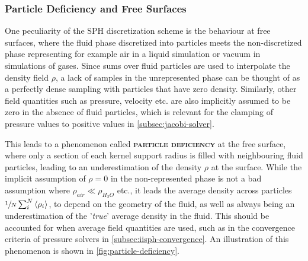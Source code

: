 \documentclass[oneside, a4paper]{book}
\newcommand\emphasis[1]{{\scshape\bfseries#1}}
\newcounter{phase}[algorithm]
\newcommand\angled[1]{\left\langle#1\right\rangle}
\begin{document}
    \subsubsection{Particle Deficiency and Free Surfaces}\label{subsec:particle-deficiency}
    One peculiarity of the SPH discretization scheme is the behaviour at free surfaces, where the fluid phase discretized into particles meets the non-discretized phase representing for example air in a liquid simulation or vacuum in simulations of gases. Since sums over fluid particles are used to interpolate the density field $\rho$, a lack of samples in the unrepresented phase can be thought of as a perfectly dense sampling with particles that have zero density. Similarly, other field quantities such as pressure, velocity etc. are also implicitly assumed to be zero in the absence of fluid particles, which is relevant for the clamping of pressure values to positive values in \autoref{subsec:jacobi-solver}. 
    
    This leads to a phenomenon called \emphasis{particle deficiency} at the free surface, where only a section of each kernel support radius is filled with neighbouring fluid particles, leading to an underestimation of the density $\rho$ at the surface. While the implicit assumption of $\rho=0$ in the non-represented phase is not a bad assumption where $\rho_{air}\ll\rho_{H_2O}$ etc., it leads the average density across particles $\sfrac{1}{N}\sum_i^N\angled{\rho_i}$, to depend on the geometry of the fluid, as well as always being an underestimation of the '\textit{true}' average density in the fluid. This should be accounted for when average field quantities are used, such as in the convergence criteria of pressure solvers in \autoref{subsec:iisph-convergence}. An illustration of this phenomenon is shown in \autoref{fig:particle-deficiency}.
\end{document}
